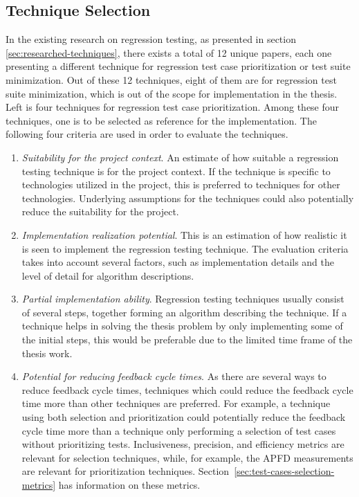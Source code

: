 \documentclass[a4paper,english,12pt]{report}
\begin{document}
\subsection{Technique Selection}
In the existing research on regression testing, as presented in section \vref{sec:researched-techniques}, there exists a total of 12 unique papers, each one presenting a different technique for regression test case prioritization or test suite minimization. Out of these 12 techniques, eight of them are for regression test suite minimization, which is out of the scope for implementation in the thesis. Left is four techniques for regression test case prioritization. Among these four techniques, one is to be selected as reference for the implementation. The following four criteria are used in order to evaluate the techniques.

\begin{enumerate}[label=EC.\arabic*]
  \item\label{itm:ec:suitability-project} \textit{Suitability for the project context}. An estimate of how suitable a regression testing technique is for the project context. If the technique is specific to technologies utilized in the project, this is preferred to techniques for other technologies. Underlying assumptions for the techniques could also potentially reduce the suitability for the project.
  \item\label{itm:ec:realization-potential} \textit{Implementation realization potential}. This is an estimation of how realistic it is seen to implement the regression testing technique. The evaluation criteria takes into account several factors, such as implementation details and the level of detail for algorithm descriptions.
  \item\label{itm:ec:partial-implementation} \textit{Partial implementation ability}. Regression testing techniques usually consist of several steps, together forming an algorithm describing the technique. If a technique helps in solving the thesis problem by only implementing some of the initial steps, this would be preferable due to the limited time frame of the thesis work.
  \item\label{itm:ec:cycle-time} \textit{Potential for reducing feedback cycle times}. As there are several ways to reduce feedback cycle times, techniques which could reduce the feedback cycle time more than other techniques are preferred. For example, a technique using both selection and prioritization could potentially reduce the feedback cycle time more than a technique only performing a selection of test cases without prioritizing tests. Inclusiveness, precision, and efficiency metrics are relevant for selection techniques, while, for example, the APFD measurements are relevant for prioritization techniques. Section~\vref{sec:test-cases-selection-metrics} has information on these metrics.
\end{enumerate}
\end{document}

